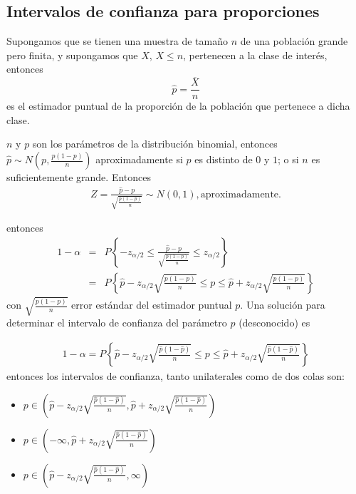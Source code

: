 \begin{itemize}
\begin{enumerate}
\subsection*{Intervalos de confianza para proporciones}

Supongamos que se tienen una muestra de tama\~no $n$ de una poblaci\'on grande pero finita, y supongamos que $X$, $X\leq n$, pertenecen a la clase de inter\'es, entonces $$\hat{p}=\frac{\overline{X}}{n}$$ es el estimador puntual de la proporci\'on de la poblaci\'on que pertenece a dicha clase.

$n$ y $p$ son los par\'ametros de la distribuci\'on binomial, entonces $\hat{p}\sim N\left(p,\frac{p\left(1-p\right)}{n}\right)$ aproximadamente si $p$ es distinto de $0$ y $1$; o si $n$ es suficientemente grande. Entonces
\begin{eqnarray*}
Z=\frac{\hat{p}-p}{\sqrt{\frac{p\left(1-p\right)}{n}}}\sim N\left(0,1\right),\textrm{aproximadamente.}
\end{eqnarray*}
 
 entonces
\begin{eqnarray*}
1-\alpha&=&P\left\{-z_{\alpha/2}\leq\frac{\hat{p}-p}{\sqrt{\frac{p\left(1-p\right)}{n}}}\leq z_{\alpha/2}\right\}\\
&=&P\left\{\hat{p}-z_{\alpha/2}\sqrt{\frac{p\left(1-p\right)}{n}}\leq p\leq \hat{p}+z_{\alpha/2}\sqrt{\frac{p\left(1-p\right)}{n}}\right\}
\end{eqnarray*}
con $\sqrt{\frac{p\left(1-p\right)}{n}}$ error est\'andar del estimador puntual $p$. Una soluci\'on para determinar el intervalo de confianza del par\'ametro $p$ (desconocido) es

\begin{eqnarray*}
1-\alpha=P\left\{\hat{p}-z_{\alpha/2}\sqrt{\frac{\hat{p}\left(1-\hat{p}\right)}{n}}\leq p\leq \hat{p}+z_{\alpha/2}\sqrt{\frac{\hat{p}\left(1-\hat{p}\right)}{n}}\right\}
\end{eqnarray*}
entonces los intervalos de confianza, tanto unilaterales como de dos colas son: 

\begin{itemize}
\item $p\in \left(\hat{p}-z_{\alpha/2}\sqrt{\frac{\hat{p}\left(1-\hat{p}\right)}{n}},\hat{p}+z_{\alpha/2}\sqrt{\frac{\hat{p}\left(1-\hat{p}\right)}{n}}\right)$
\item $p\in \left(-\infty,\hat{p}+z_{\alpha/2}\sqrt{\frac{\hat{p}\left(1-\hat{p}\right)}{n}}\right)$
\item $p\in \left(\hat{p}-z_{\alpha/2}\sqrt{\frac{\hat{p}\left(1-\hat{p}\right)}{n}},\infty\right)$
\end{itemize}


\end{enumerate}
\end{itemize}
